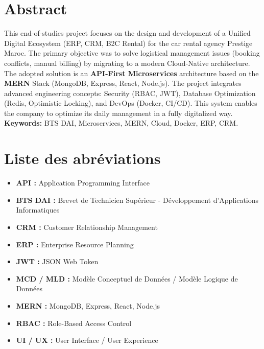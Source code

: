 \chapter*{Abstract}
This end-of-studies project focuses on the design and development of a Unified Digital Ecosystem (ERP, CRM, B2C Rental) for the car rental agency Prestige Maroc. The primary objective was to solve logistical management issues (booking conflicts, manual billing) by migrating to a modern Cloud-Native architecture.
The adopted solution is an \textbf{API-First Microservices} architecture based on the \textbf{MERN} Stack (MongoDB, Express, React, Node.js). The project integrates advanced engineering concepts: Security (RBAC, JWT), Database Optimization (Redis, Optimistic Locking), and DevOps (Docker, CI/CD). This system enables the company to optimize its daily management in a fully digitalized way. \\
\textbf{Keywords:} BTS DAI, Microservices, MERN, Cloud, Docker, ERP, CRM.

\chapter*{Liste des abréviations}
\begin{itemize}
    \item \textbf{API :} Application Programming Interface
    \item \textbf{BTS DAI :} Brevet de Technicien Supérieur - Développement d'Applications Informatiques
    \item \textbf{CRM :} Customer Relationship Management
    \item \textbf{ERP :} Enterprise Resource Planning
    \item \textbf{JWT :} JSON Web Token
    \item \textbf{MCD / MLD :} Modèle Conceptuel de Données / Modèle Logique de Données
    \item \textbf{MERN :} MongoDB, Express, React, Node.js
    \item \textbf{RBAC :} Role-Based Access Control
    \item \textbf{UI / UX :} User Interface / User Experience
\end{itemize}

